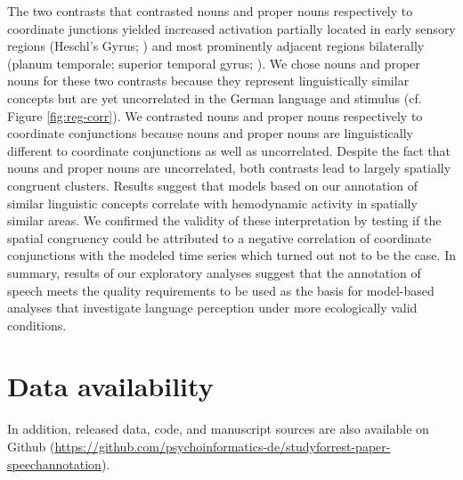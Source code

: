 \documentclass[10pt,a4paper,onecolumn]{article}
\begin{document}
The two contrasts that contrasted nouns and proper nouns respectively to
coordinate junctions yielded increased activation partially located in early
sensory regions (Heschl's Gyrus; \citep{saenz2014tonotopic}) and most
prominently adjacent regions bilaterally (planum temporale; superior temporal
gyrus; \citep{arsenault2015distributed, mesgarani2014phonetic}).
We chose nouns and proper nouns for these two contrasts because they represent
linguistically similar concepts but are yet uncorrelated in the German language
and stimulus (cf. Figure \ref{fig:reg-corr}).
We contrasted nouns and proper nouns respectively to coordinate conjunctions
because nouns and proper nouns are linguistically different to coordinate
conjunctions as well as uncorrelated.
 Despite the fact that
nouns and proper nouns are uncorrelated, both contrasts lead to largely
spatially congruent clusters. Results suggest that models based on our
annotation of similar linguistic concepts correlate with hemodynamic activity in
spatially similar areas.
We confirmed the validity of these interpretation by testing if the spatial
congruency could be attributed to a negative correlation of coordinate
conjunctions with the modeled time series which turned out not to be the case.
In summary, results of our exploratory analyses suggest that the annotation of
speech meets the quality requirements to be used as the basis for model-based
analyses that investigate language perception under more ecologically valid
conditions.


\section*{Data availability} 

In addition, released data, code, and manuscript sources are also available on
Github (\url{https://github.com/psychoinformatics-de/studyforrest-paper-speechannotation}).
\end{document}
